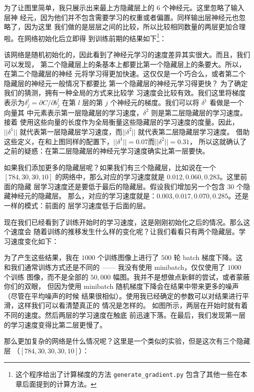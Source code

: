 为了让图里简单，我只展示出来最上方隐藏层上的 $6$ 个神经元。这里忽略了输入层神
经元，因为他们并不包含需要学习的权重或者偏置。同样输出层神经元也忽略了，因为这里
我们做的是层层之间的比较，所以比较相同数量的两层更加合理啦。在网络初始化后立即得
到训练前期的结果如下\footnote{这个程序给出了计算梯度的方法
  \lstinline!generate_gradient.py! 包含了其他一些在本章后面提到的计算方法。}：


该网络是随机初始化的，因此看到了神经元学习的速度差异其实很大。而且，我们可以发现，
第二个隐藏层上的条基本上都要比第一个隐藏层上的条要大。所以，在第二个隐藏层的神经
元将学习得更加快速。这仅仅是一个巧合么，或者第二个隐藏层的神经元一般情况下都要比
第一个隐藏层的神经元学习得更快？ 为了确定我们的猜测，拥有一种全局的方式来比较学
习速度会比较有效。我们这里将梯度表示为$\delta_j^l = \partial C/\partial b_j^l$
在第 $l$ 层的第 $j$ 个神经元的梯度。我们可以将 $\delta^1$ 看做是一个向量其
中元素表示第一层隐藏层的学习速度，$\delta^2$ 则是第二层隐藏层的学习速度。接着
使用这些向量的长度作为全局衡量这些隐藏层的学习速度的度量。因此，$||\delta^1||$
就代表第一层隐藏层学习速度，而$||\delta^2||$ 就代表第二层隐藏层学习速度。 借助
这些定义，在和上图同样的配置下，$||\delta^1|| = 0.07$而$||\delta^2|| = 0.31$，
所以这就确认了之前的疑惑：在第二层隐藏层的神经元学习速度确实比第一层要快。
 
如果我们添加更多的隐藏层呢？如果我们有三个隐藏层，比如说在一个 $[784, 30, 30,
  10]$ 的网络中，那么对应的学习速度就是 $0.012, 0.060, 0.283$。这里前面的隐藏
层学习速度还是要低于最后的隐藏层。假设我们增加另一个包含 30 个隐藏神经元的隐藏层。
那么，对应的学习速度就是：$0.003, 0.017, 0.070, 0.285$。还是一样的模式：前面的
层学习速度低于后面的层。

现在我们已经看到了训练开始时的学习速度，这是刚刚初始化之后的情况。那么这个速度会
随着训练的推移发生什么样的变化呢？让我们看看只有两个隐藏层。学习速度变化如下：
 
为了产生这些结果，我在 $1000$ 个训练图像上进行了 $500$ 轮 batch 梯度下降。这
和我们通常训练方式还是不同的 —— 我没有使用 minibatch，仅仅使用了 $1000$ 个训练
图像，而不是全部的 $50,000$ 幅图。我并不是想做点新鲜的尝试，或者蒙蔽你们的双眼，
但因为使用 minibatch 随机梯度下降会在结果中带来更多的噪声（尽管在平均噪声的时候
  结果很相似）。使用我已经确定的参数可以对结果进行平滑，这样我们可以看清楚真正的
情况是怎样的。 如图所示，两层在开始时就有着不同的速度。然后两层的学习速度在触底
前迅速下落。在最后，我们发现第一层的学习速度变得比第二层更慢了。
 
那么更加复杂的网络是什么情况呢？这里是一个类似的实验，但是这次有三个隐藏层
（$[784, 30, 30, 30, 10]$）：
 
